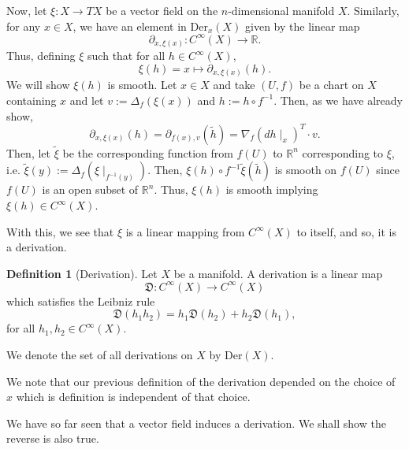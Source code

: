 \documentclass[]{article}
\theoremstyle{definition}
\theoremstyle{definition}
\newtheorem{definition}{Definition}[section]
\begin{document}
Now, let \(\xi : X \to TX\) be a vector field on the \(n\)-dimensional manifold 
\(X\). Similarly, for any \(x \in X\), we have an element in \(\text{Der}_x(X)\) 
given by the linear map 
\[\partial_{x, \xi(x)} : C^\infty(X) \to \mathbb{R}.\]
Thus, defining \(\xi\) such that for all \(h \in C^\infty(X)\), 
\[\xi(h) = x \mapsto \partial_{x, \xi(x)}(h).\]
We will show \(\xi(h)\) is smooth. Let \(x \in X\) and take \((U, f)\) be a chart 
on \(X\) containing \(x\) and let \(v := \Delta_f(\xi(x))\) and 
\(h := h \circ f^{-1}\). Then, as we have already show, 
\[\partial_{x, \xi(x)}(h) = \partial_{f(x), v}(\tilde h) = \nabla_f (dh\mid_x)^T \cdot v.\]
Then, let \(\tilde \xi\) be the corresponding function from \(f(U)\) to \(\mathbb{R}^n\) 
corresponding to \(\xi\), i.e. \(\tilde\xi(y) := \Delta_f(\xi\mid_{f^{-1}(y)})\). 
Then, \(\xi(h) \circ f^{-1} \tilde \xi(\tilde h)\) is smooth on \(f(U)\) since 
\(f(U)\) is an open subset of \(\mathbb{R}^n\). Thus, \(\xi(h)\) is smooth 
implying \(\xi(h) \in C^\infty(X)\).

With this, we see that \(\xi\) is a linear mapping from \(C^\infty(X)\) to itself, 
and so, it is a derivation.

\begin{definition}[Derivation]
  Let \(X\) be a manifold. A derivation is a linear map 
  \[\mathfrak{D} : C^\infty(X) \to C^\infty(X)\]
  which satisfies the Leibniz rule 
  \[\mathfrak{D}(h_1h_2) = h_1 \mathfrak{D}(h_2) + h_2 \mathfrak{D}(h_1),\]
  for all \(h_1, h_2 \in C^\infty(X)\).

  We denote the set of all derivations on \(X\) by \(\text{Der}(X)\).
\end{definition}

We note that our previous definition of the derivation depended on the choice 
of \(x\) which is definition is independent of that choice.

We have so far seen that a vector field induces a derivation. We shall show 
the reverse is also true.
\end{document}

